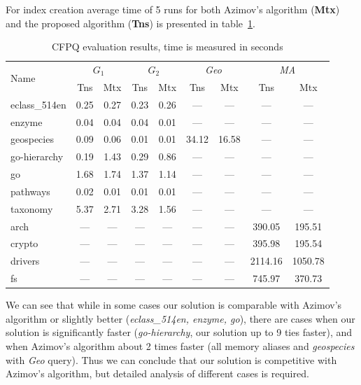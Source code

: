 For index creation average time of 5 runs for both Azimov's algorithm (\textbf{Mtx}) and the proposed algorithm (\textbf{Tns}) is presented in table~\ref{tbl:CFPQ_index}.

{\setlength{\tabcolsep}{0.2em}
  \begin{table}
    \caption{CFPQ evaluation results, time is measured in seconds}
    \label{tbl:CFPQ_index}
    \small
    \begin{tabular}{| l | c | c | c | c | c | c | c | c |}
      \hline
      
      \multirow{2}{*}{Name}  & \multicolumn{2}{c|}{$G_1$} & \multicolumn{2}{c|}{$G_2$} & \multicolumn{2}{c|}{\textit{Geo}} & \multicolumn{2}{c|}{\textit{MA}}\\
      \cline{2-9}
                      & Tns    & Mtx    & Tns  & Mtx  & Tns   & Mtx   & Tns     & Mtx \\
      \hline
      \hline
      eclass\_514en   & 0.25   & 0.27   & 0.23 & 0.26 & ---   & ---   & ---     & ---\\
      enzyme          & 0.04   & 0.04   & 0.04 & 0.01 & ---   & ---   & ---     & ---\\
      geospecies      & 0.09   & 0.06   & 0.01 & 0.01 & 34.12 & 16.58 & ---     & ---\\
      go-hierarchy    & 0.19   & 1.43   & 0.29 & 0.86 & ---   & ---   & ---     & ---\\
      go              & 1.68   & 1.74   & 1.37 & 1.14 & ---   & ---   & ---     & ---\\
      pathways        & 0.02   & 0.01   & 0.01 & 0.01 & ---   & ---   & ---     & ---\\
      taxonomy        & 5.37   & 2.71   & 3.28 & 1.56 & ---   & ---   & ---     & ---\\
      \hline
      arch            & ---    & ---    & ---  & ---  & ---   & ---   & 390.05  & 195.51  \\
      crypto          & ---    & ---    & ---  & ---  & ---   & ---   & 395.98  & 195.54  \\
      drivers         & ---    & ---    & ---  & ---  & ---   & ---   & 2114.16 & 1050.78 \\
      fs              & ---    & ---    & ---  & ---  & ---   & ---   & 745.97  & 370.73  \\
      \hline
    \end{tabular}
  \end{table}
}

We can see that while in some cases our solution is comparable with Azimov's algorithm or slightly better (\textit{eclass\_514en, enzyme, go}), there are cases when our solution is significantly faster (\textit{go-hierarchy}, our solution up to 9 ties faster), and when Azimov's algorithm about 2 times faster (all memory aliases and \textit{geospecies} with \textit{Geo} query). 
Thus we can conclude that our solution is competitive with Azimov's algorithm, but detailed analysis of different cases is required.

